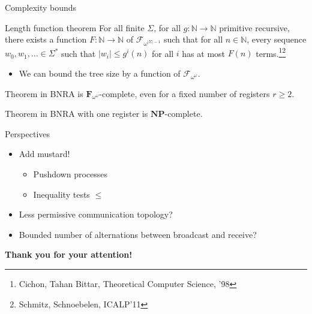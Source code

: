 \documentclass{beamer}
\begin{document}
\begin{frame}{Complexity bounds}
	
	
	
	\begin{block}{Length function theorem}
		For all finite $\Sigma$, for all $g : \mathbb{N} \to \mathbb{N}$ primitive recursive, there exists a function $F : \mathbb{N} \to \mathbb{N}$ of $\mathcal{F}_{\omega^{|\Sigma|-1}}$ such that for all $n \in \mathbb{N}$, every sequence $w_0, w_1, \ldots \in \Sigma^*$ such that $|w_i| \leq g^i(n)$ for all $i$ has at most $F(n)$ terms.\footnote{Cichon, Tahan Bittar, Theoretical Computer Science, '98}\footnote{Schmitz, Schnoebelen, ICALP'11}
	\end{block}
	
	\begin{itemize}
		\item We can bound the tree size by a function of $\mathcal{F}_{\omega^{\omega}}$.
	\end{itemize}
	
%	
	\pause
	\begin{block}{Theorem}
		{} in BNRA is $\mathbf{F}_{\omega^\omega}$-complete, even for a fixed number of registers $r\geq 2$.
	\end{block}
	
	\pause
	
	\begin{block}{Theorem}
		 {} in BNRA with one register is $\mathbf{NP}$-complete.
	\end{block}
\end{frame}

\begin{frame}{Perspectives}
\begin{itemize}
	\item Add mustard! \begin{itemize}
		\item Pushdown processes
		\item Inequality tests $\leq$
	\end{itemize} 
		
	\item Less permissive communication topology?
	
	\item Bounded number of alternations between broadcast and receive?
\end{itemize} 
\end{frame}

\begin{frame}{}
	
	\Huge \textbf{Thank you for your attention!}
	
\end{frame}
\end{document}
